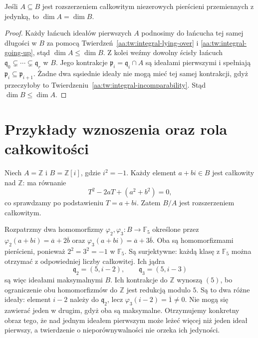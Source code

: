 \begin{wniosek}\label{aa:cor:integral-dimension}
Jeśli $A\subseteq B$ jest rozszerzeniem całkowitym niezerowych
pierścieni przemiennych z jedynką, to $\dim A=\dim B$.
\end{wniosek}
\begin{proof}
Każdy łańcuch ideałów pierwszych $A$ podnosimy do łańcucha
tej samej długości w $B$ za pomocą
Twierdzeń~\ref{aa:tw:integral-lying-over} i
\ref{aa:tw:integral-going-up}, stąd $\dim A\le\dim B$.
Z kolei weźmy dowolny ścisły łańcuch
$\mathfrak q_0\subsetneq\cdots\subsetneq\mathfrak q_r$
w $B$. Jego kontrakcje $\mathfrak p_i=\mathfrak q_i\cap A$
są ideałami pierwszymi i spełniają
$\mathfrak p_i\subseteq\mathfrak p_{i+1}$.
Żadne dwa sąsiednie ideały nie mogą mieć tej samej kontrakcji,
gdyż przeczyłoby to
Twierdzeniu~\ref{aa:tw:integral-incomparability}.
Stąd $\dim B\le\dim A$.
\end{proof}


\section{Przykłady wznoszenia oraz rola całkowitości}
\begin{przyklad}
\label{aa:prz:integral-gaussian-five}
Niech $A=\mathbb Z$ i $B=\mathbb Z[i]$, gdzie $i^2=-1$.
Każdy element $a+bi\in B$ jest całkowity nad $\mathbb Z$:
ma równanie
\[
T^2-2aT+(a^2+b^2)=0,
\]
co sprawdzamy po podstawieniu $T=a+bi$. Zatem $B/A$
jest rozszerzeniem całkowitym.

Rozpatrzmy dwa homomorfizmy
$\varphi_2,\varphi_3:B\to\mathbb F_5$ określone przez
$\varphi_2(a+bi)=\overline a+2\overline b$ oraz
$\varphi_3(a+bi)=\overline a+3\overline b$.
Oba są homomorfizmami pierścieni, ponieważ
$2^2=3^2=-1$ w $\mathbb F_5$.
Są surjektywne: każdą klasę z $\mathbb F_5$ można otrzymać
z odpowiedniej liczby całkowitej. Ich jądra
\[
\mathfrak q_2=(5,i-2),\qquad
\mathfrak q_3=(5,i-3)
\]
są więc ideałami maksymalnymi $B$. Ich kontrakcje do
$\mathbb Z$ wynoszą $(5)$, bo ograniczenie obu
homomorfizmów do $\mathbb Z$ jest redukcją modulo $5$.
Są to dwa różne ideały: element $i-2$ należy do
$\mathfrak q_2$, lecz
$\varphi_3(i-2)=\overline 1\ne0$.
Nie mogą się zawierać jeden w drugim, gdyż oba są
maksymalne. Otrzymujemy konkretny obraz tego, że nad jednym
ideałem pierwszym może leżeć więcej niż jeden ideał pierwszy,
a twierdzenie o nieporównywalności nie orzeka ich jedyności.
\end{przyklad}



